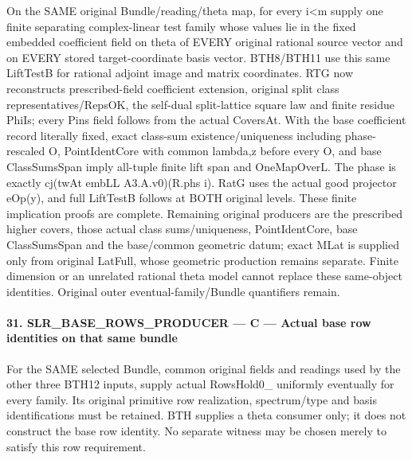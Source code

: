On the SAME original Bundle/reading/theta map, for every i<m supply one finite separating complex-linear test family whose values lie in the fixed embedded coefficient field on theta of EVERY original rational source vector and on EVERY stored target-coordinate basis vector. BTH8/BTH11 use this same LiftTestB for rational adjoint image and matrix coordinates. RTG now reconstructs prescribed-field coefficient extension, original split class representatives/RepsOK, the self-dual split-lattice square law and finite residue PhiIs; every Pins field follows from the actual CoversAt. With the base coefficient record literally fixed, exact class-sum existence/uniqueness including phase-rescaled O, PointIdentCore with common lambda,z before every O, and base ClassSumsSpan imply all-tuple finite lift span and OneMapOverL. The phase is exactly cj(twAt embLL A3.A.v0)(R.phs i). RatG uses the actual good projector eOp(y), and full LiftTestB follows at BOTH original levels. These finite implication proofs are complete. Remaining original producers are the prescribed higher covers, those actual class sums/uniqueness, PointIdentCore, base ClassSumsSpan and the base/common geometric datum; exact MLat is supplied only from original LatFull, whose geometric production remains separate. Finite dimension or an unrelated rational theta model cannot replace these same-object identities. Original outer eventual-family/Bundle quantifiers remain.



\paragraph{31. SLR\_\allowbreak BASE\_\allowbreak ROWS\_\allowbreak PRODUCER — C — Actual base row identities on that same bundle}

For the SAME selected Bundle, common original fields and readings used by the other three BTH12 inputs, supply actual RowsHold0\_ uniformly eventually for every family. Its original primitive row realization, spectrum/type and basis identifications must be retained. BTH supplies a theta consumer only; it does not construct the base row identity. No separate witness may be chosen merely to satisfy this row requirement.


